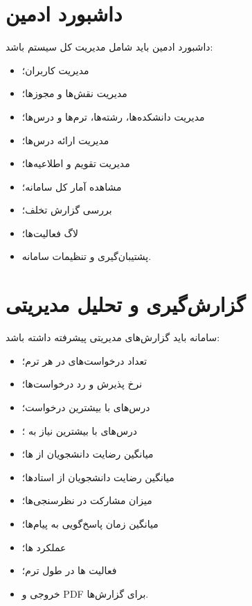\documentclass[12pt,a4paper]{article}
\begin{document}
\section{داشبورد ادمین}
داشبورد ادمین باید شامل مدیریت کل سیستم باشد:
\begin{itemize}
\item مدیریت کاربران؛
\item مدیریت نقش‌ها و مجوزها؛
\item مدیریت دانشکده‌ها، رشته‌ها، ترم‌ها و درس‌ها؛
\item مدیریت ارائه درس‌ها؛
\item مدیریت تقویم و اطلاعیه‌ها؛
\item مشاهده آمار کل سامانه؛
\item بررسی گزارش تخلف؛
\item لاگ فعالیت‌ها؛
\item پشتیبان‌گیری و تنظیمات سامانه.
\end{itemize}

\section{گزارش‌گیری و تحلیل مدیریتی}
سامانه باید گزارش‌های مدیریتی پیشرفته داشته باشد:
\begin{itemize}
\item تعداد درخواست‌های  در هر ترم؛
\item نرخ پذیرش و رد درخواست‌ها؛
\item درس‌های با بیشترین درخواست؛
\item درس‌های با بیشترین نیاز به ؛
\item میانگین رضایت دانشجویان از ها؛
\item میانگین رضایت دانشجویان از استادها؛
\item میزان مشارکت در نظرسنجی‌ها؛
\item میانگین زمان پاسخ‌گویی به پیام‌ها؛
\item عملکرد ها؛
\item فعالیت ها در طول ترم؛
\item خروجی  و PDF برای گزارش‌ها.
\end{itemize}
\end{document}
